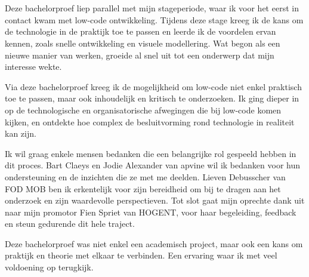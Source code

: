 
\chapter{}%
\label{ch:voorwoord}

Deze bachelorproef liep parallel met mijn stageperiode, waar ik voor het eerst in contact kwam met low-code ontwikkeling. Tijdens deze stage kreeg ik de kans om de technologie in de praktijk toe te passen en leerde ik de voordelen ervan kennen, zoals snelle ontwikkeling en visuele modellering. Wat begon als een nieuwe manier van werken, groeide al snel uit tot een onderwerp dat mijn interesse wekte.

Via deze bachelorproef kreeg ik de mogelijkheid om low-code niet enkel praktisch toe te passen, maar ook inhoudelijk en kritisch te onderzoeken. Ik ging dieper in op de technologische en organisatorische afwegingen die bij low-code komen kijken, en ontdekte hoe complex de besluitvorming rond technologie in realiteit kan zijn.

Ik wil graag enkele mensen bedanken die een belangrijke rol gespeeld hebben in dit proces. Bart Claeys en Jodie Alexander van apvine wil ik bedanken voor hun ondersteuning en de inzichten die ze met me deelden. Lieven Debusscher van \gls{FOD MOB} ben ik erkentelijk voor zijn bereidheid om bij te dragen aan het onderzoek en zijn waardevolle perspectieven. Tot slot gaat mijn oprechte dank uit naar mijn promotor Fien Spriet van HOGENT, voor haar begeleiding, feedback en steun gedurende dit hele traject.

Deze bachelorproef was niet enkel een academisch project, maar ook een kans om praktijk en theorie met elkaar te verbinden. Een ervaring waar ik met veel voldoening op terugkijk.


